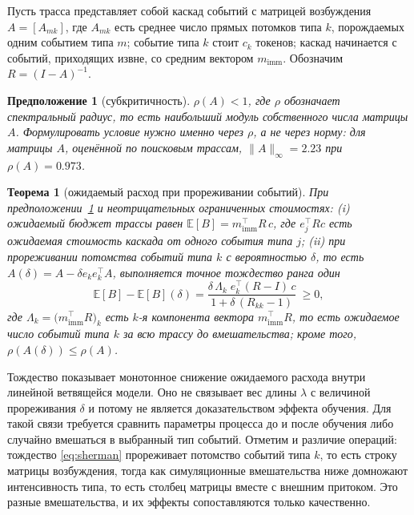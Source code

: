 \documentclass[11pt]{article}
\newtheorem{theorem}{Теорема}
\newtheorem{assumption}{Предположение}
\begin{document}
Пусть трасса представляет собой каскад событий с матрицей возбуждения $A=[A_{mk}]$, где $A_{mk}$ есть среднее число прямых потомков типа $k$, порождаемых одним событием типа $m$; событие типа $k$ стоит $c_k$ токенов; каскад начинается с событий, приходящих извне, со средним вектором $m_{\mathrm{imm}}$. Обозначим $R=(I-A)^{-1}$.

\begin{assumption}[субкритичность]\label{a1}
$\rho(A)<1$, где $\rho$ обозначает спектральный радиус, то есть наибольший модуль собственного числа матрицы $A$. Формулировать условие нужно именно через $\rho$, а не через норму: для матрицы $A$, оценённой по поисковым трассам, $\lVert A\rVert_\infty=2.23$ при $\rho(A)=0.973$.
\end{assumption}
\begin{theorem}[ожидаемый расход при прореживании событий]\label{thm:as}
При предположении~\ref{a1} и неотрицательных ограниченных стоимостях: (i) ожидаемый бюджет трассы равен $\mathbb E[B]=m_{\mathrm{imm}}^{\top}R\,c$, где $e_j^{\top}Rc$ есть ожидаемая стоимость каскада от одного события типа $j$; (ii) при прореживании потомства событий типа $k$ с вероятностью $\delta$, то есть $A(\delta)=A-\delta e_ke_k^{\top}A$, выполняется точное тождество ранга один
\begin{equation}
\mathbb E[B]-\mathbb E[B](\delta)=\frac{\delta\,\Lambda_k\;e_k^{\top}(R-I)\,c}{1+\delta\,(R_{kk}-1)}\ \ge 0,
\label{eq:sherman}
\end{equation}
где $\Lambda_k=\bigl(m_{\mathrm{imm}}^{\top}R\bigr)_k$ есть $k$-я компонента вектора $m_{\mathrm{imm}}^{\top}R$, то есть ожидаемое число событий типа $k$ за всю трассу до вмешательства; кроме того, $\rho(A(\delta))\le\rho(A)$.
\end{theorem}

Тождество показывает монотонное снижение ожидаемого расхода внутри линейной ветвящейся модели. Оно не связывает вес длины $\lambda$ с величиной прореживания $\delta$ и потому не является доказательством эффекта обучения. Для такой связи требуется сравнить параметры процесса до и после обучения либо случайно вмешаться в выбранный тип событий. Отметим и различие операций: тождество \eqref{eq:sherman} прореживает потомство событий типа $k$, то есть строку матрицы возбуждения, тогда как симуляционные вмешательства ниже домножают интенсивность типа, то есть столбец матрицы вместе с внешним притоком. Это разные вмешательства, и их эффекты сопоставляются только качественно.
\end{document}
